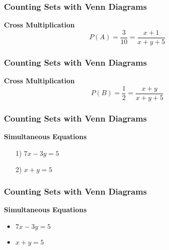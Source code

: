 \documentclass{beamer}
\begin{document}
\begin{frame}
\frametitle{Counting Sets with Venn Diagrams}
\Large
\vspace{-2.5cm}
\textbf{Cross Multiplication}
\[ P(A) = \frac{3}{10} = \frac{x+1}{x+y+5}\]

\end{frame}


\begin{frame}
\frametitle{Counting Sets with Venn Diagrams}
\Large
\vspace{-2.5cm}
\textbf{Cross Multiplication}
\[ P(B) = \frac{1}{2} = \frac{x+y}{x+y+5} \]

\end{frame}


\begin{frame}
\frametitle{Counting Sets with Venn Diagrams}
\Large
\vspace{-2.8cm}
\textbf{Simultaneous Equations}
\begin{itemize}
\item[1)] $7x-3y=5$
\item[2)] $x+y=5$
\end{itemize}
\end{frame}

\begin{frame}
\frametitle{Counting Sets with Venn Diagrams}
\Large
\vspace{-2.8cm}
\textbf{Simultaneous Equations}
\begin{itemize}
\item $7x-3y=5$
\item $x+y=5$
\end{itemize}
\end{frame}
\end{document}
